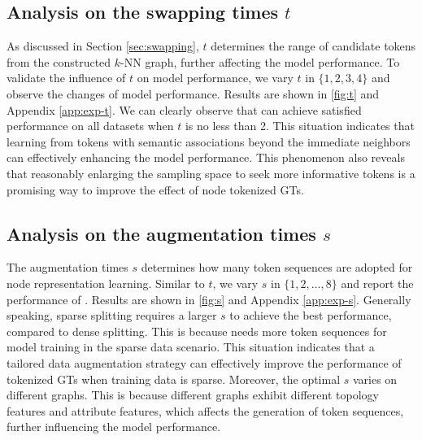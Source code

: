\subsection{Analysis on the swapping times $t$}
As discussed in Section \ref{sec:swapping}, $t$ determines the range of candidate tokens from the constructed $k$-NN graph, further affecting the model performance.
To validate the influence of $t$ on model performance, we vary $t$ in $\{1,2,3,4\}$ and observe the changes of model performance.
Results are shown in \autoref{fig:t} and Appendix \ref{app:exp-t}.
We can clearly observe that \name can achieve satisfied performance on all datasets when $t$ is no less than 2.
This situation indicates that learning from tokens with semantic associations beyond the immediate neighbors can effectively enhancing the model performance.
This phenomenon also reveals that reasonably enlarging  the sampling space to seek more informative tokens is a promising way to improve the effect of node tokenized GTs.

\subsection{Analysis on the augmentation times $s$}
The augmentation times $s$ determines how many token sequences are adopted for node representation learning. Similar to $t$, we vary $s$ in $\{1,2,\dots,8\}$ and report the performance of \name. 
Results are shown in \autoref{fig:s} and Appendix \ref{app:exp-s}.
Generally speaking, sparse splitting requires a larger $s$ to achieve the best performance, compared to dense splitting.
This is because \name needs more token sequences for model training in the sparse data scenario.
This situation indicates that a tailored data augmentation strategy can effectively improve the performance of tokenized GTs when training data is sparse.
Moreover, the optimal $s$ varies on different graphs. 
This is because different graphs exhibit different topology features and attribute features, which affects the generation of token sequences, further influencing the model performance.


